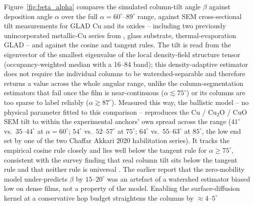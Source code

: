 \documentclass[aip,amsmath,amssymb,reprint]{revtex4-1}
\newcommand{\dang}{\ensuremath{\alpha}}
\begin{document}
Figure~\ref{fig:beta_alpha} compares the simulated column-tilt angle
$\beta$ against deposition angle $\dang$ over the full
$\dang=60^{\circ}$--$89^{\circ}$ range, against SEM cross-sectional tilt
measurements for GLAD Cu and its oxides -- including two previously
unincorporated metallic-Cu series from \citet{chaffarhabilitation2020},
glass substrate, thermal-evaporation GLAD -- and against the cosine and
tangent rules. The tilt is read from the eigenvector of the smallest eigenvalue of
the local density-field structure tensor (occupancy-weighted median with a
16--84 band); this density-adaptive estimator does not require the
individual columns to be watershed-separable and therefore returns a value
across the whole angular range, unlike the column-segmentation estimators
that fail once the film is near-continuous ($\dang\lesssim75^{\circ}$) or
its columns are too sparse to label reliably ($\dang\gtrsim87^{\circ}$).
Measured this way, the ballistic model -- no physical parameter fitted to
this comparison -- reproduces the Cu /
Cu$_2$O / CuO SEM tilt to within the experimental anchors' own spread
across the range ($41^{\circ}$ vs.\ $35$--$44^{\circ}$ at $\dang=60^{\circ}$;
$54^{\circ}$ vs.\ $52$--$57^{\circ}$ at $75^{\circ}$; $64^{\circ}$ vs.\
$55$--$63^{\circ}$ at $85^{\circ}$, the low end set by one of the two
Chaffar Akkari 2020 habilitation series). It tracks the empirical cosine rule closely and lies well
below the tangent rule for $\dang\geq75^{\circ}$, consistent with the
survey finding that real column tilt sits below the tangent rule and that
neither rule is universal
\citep{zhu2012tilting,alvarez2014beyondtangent,barranco2016}. The earlier
report that the zero-mobility model under-predicts $\beta$ by $15$--$20^{\circ}$
was an artefact of a watershed estimator biased low on dense films, not a
property of the model. Enabling the surface-diffusion kernel at a
conservative hop budget straightens the columns by $\approx4$--$5^{\circ}$
\end{document}
